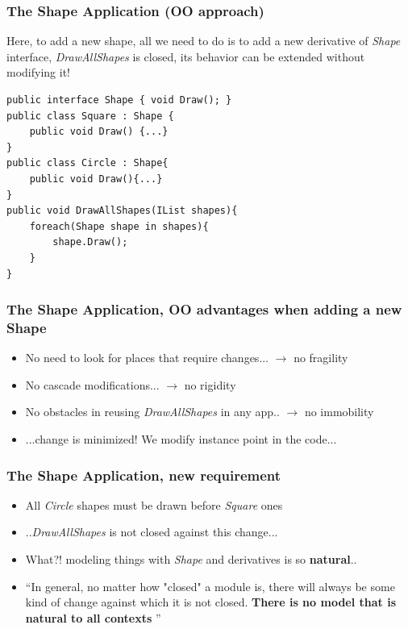 \documentclass{beamer}
\begin{document}
\begin{frame}[containsverbatim]
	\frametitle{The Shape Application (OO approach)}
	Here, to add a new shape, all we need to do is to add a new derivative of \textit{Shape} interface, \textit{DrawAllShapes} is closed, its behavior can be extended without modifying it!\\
	\begin{lstlisting}
public interface Shape { void Draw(); }
public class Square : Shape {
	public void Draw() {...}
}
public class Circle : Shape{
	public void Draw(){...}
}
public void DrawAllShapes(IList shapes){
	foreach(Shape shape in shapes){
		shape.Draw();
	}
}
	\end{lstlisting}
\end{frame}

\begin{frame}
  \frametitle{The Shape Application, OO advantages when adding a new Shape}
  \begin{itemize}
	\item<+-> No need to look for places that require changes... $ \rightarrow $ no fragility
	\item<+-> No cascade modifications... $ \rightarrow $ no rigidity
	\item<+-> No obstacles in reusing \textit{DrawAllShapes} in any app.. $ \rightarrow $ no immobility
	\item<+-> ...change is minimized! We modify instance point in the code...
   \end{itemize}
\end{frame}

\begin{frame}
  \frametitle{The Shape Application, new requirement}
  \begin{itemize}
	\item<+-> All \textit{Circle} shapes must be drawn before \textit{Square} ones
	\item<+-> ..\textit{DrawAllShapes} is not closed against this change...
	\item<+-> What?! modeling things with \textit{Shape} and derivatives is so \textbf{natural}..
	\item<+->  ``In general, no matter how "closed" a module is, there will
always be some kind of change against which it is not closed. \textbf{There is no model that is natural to all
contexts} ''
   \end{itemize}
\end{frame}
\end{document}
